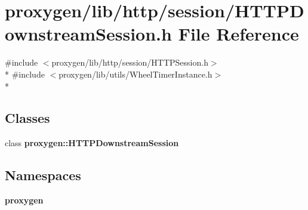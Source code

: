 \section{proxygen/lib/http/session/\+H\+T\+T\+P\+Downstream\+Session.h File Reference}
\label{HTTPDownstreamSession_8h}
{\ttfamily \#include $<$proxygen/lib/http/session/\+H\+T\+T\+P\+Session.\+h$>$}\\*
{\ttfamily \#include $<$proxygen/lib/utils/\+Wheel\+Timer\+Instance.\+h$>$}\\*
\subsection*{Classes}
\begin{DoxyCompactItemize}
\item 
class {\bf proxygen\+::\+H\+T\+T\+P\+Downstream\+Session}
\end{DoxyCompactItemize}
\subsection*{Namespaces}
\begin{DoxyCompactItemize}
\item 
 {\bf proxygen}
\end{DoxyCompactItemize}
